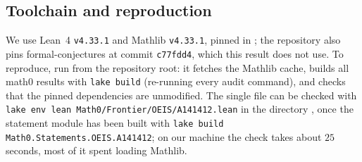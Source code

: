 \documentclass[11pt]{amsart}
\theoremstyle{plain}
\theoremstyle{definition}
\begin{document}
\subsection*{Toolchain and reproduction}
We use Lean~4 \cite{Lean4} \texttt{v4.33.1} and Mathlib \cite{Mathlib} \texttt{v4.33.1}, pinned in ; the repository also pins formal-conjectures \cite{FC} at commit \texttt{c77fdd4}, which this result does not use.
To reproduce, run  from the repository root: it fetches the Mathlib cache, builds all math0 results with \texttt{lake build} (re-running every audit command), and checks that the pinned dependencies are unmodified. The single file can be checked with \texttt{lake env lean Math0/Frontier/OEIS/A141412.lean} in the directory , once the statement module has been built with \texttt{lake build Math0.Statements.OEIS.A141412}; on our machine the check takes about $25$ seconds, most of it spent loading Mathlib.
\end{document}

